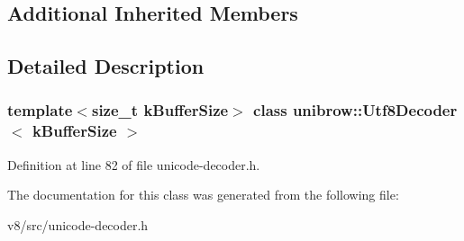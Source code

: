 \subsection*{Additional Inherited Members}


\subsection{Detailed Description}
\subsubsection*{template$<$size\+\_\+t k\+Buffer\+Size$>$\newline
class unibrow\+::\+Utf8\+Decoder$<$ k\+Buffer\+Size $>$}



Definition at line 82 of file unicode-\/decoder.\+h.



The documentation for this class was generated from the following file\+:\begin{DoxyCompactItemize}
\item 
v8/src/unicode-\/decoder.\+h\end{DoxyCompactItemize}
